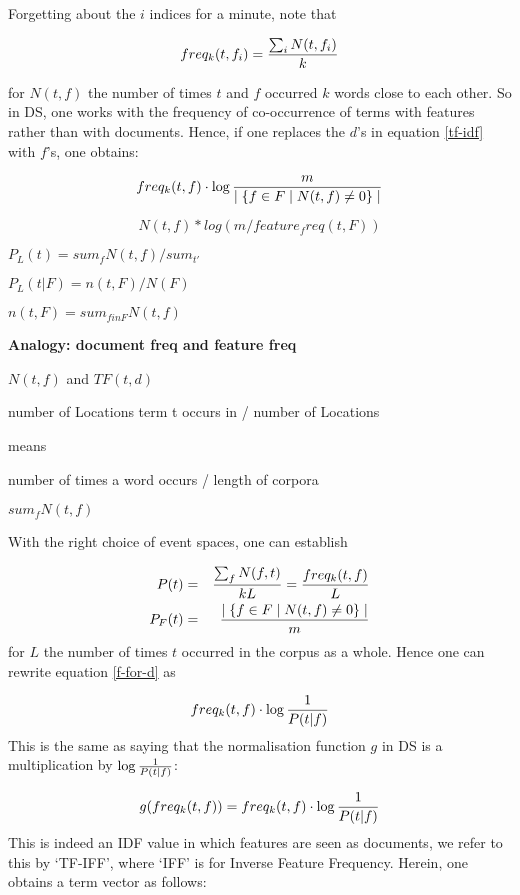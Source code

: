 Forgetting about the $i$ indices for a minute, note that 

\begin{equation}
freq_k(t,f_i) = {{\sum_i N(t,f_i)} \over {k}}
\end{equation}

for $N(t, f)$ the number of times $t$ and $f$ occurred  $k$ words close to each other.  So in DS, one works with the frequency of co-occurrence of terms with features rather than with documents. Hence, if one replaces the $d$'s in equation \ref{tf-idf} with $f$'s, one obtains:

\begin{equation}
\label{f-for-d}
freq_k(t, f) \cdot \log{{m} \over {\mid \{f \in F \mid N(t,f)  \neq 0 \}\mid}}
\end{equation}

\[
N(t, f) * log ( m / feature_freq ( t, F ) )
\]


$P_L ( t ) = sum_f N( t, f)  /  sum_{ t' }$

$P_L ( t | F ) = n (t , F) / N ( F )$

$ n ( t , F ) = sum_{f in F} N(t, f)$


{\bf Analogy: document  freq and  feature freq}

$N(t,f)$ and $TF(t,d)$




number of Locations term t occurs in / number of Locations

means

number of times a word occurs / length of corpora

$sum_f N(t,f)$

With the right choice of event spaces, one can establish

\begin{eqnarray}
P(t) &=&  {{\sum_f N(f,t)} \over {kL}} = {{freq_k(t,f)} \over {L}}\\
P_F (t) &=&  {{\mid \{f \in F \mid N(t,f)  \neq 0 \}\mid} \over {m}}
\end{eqnarray}
for $L$ the number of times $t$ occurred in the corpus as a whole.  Hence one can rewrite equation \ref{f-for-d} as

\begin{equation}
freq_k(t,f) \cdot \log{1 \over P(t|f)}
\end{equation}
This is the same as saying that  the normalisation function $g$ in DS is a multiplication by $ \log{1 \over P(t|f)}$:

\[
g(freq_k(t, f)) = freq_k(t,f) \cdot \log{1 \over P(t|f)}
\]
This  is indeed an IDF value in which features are seen as documents, we refer to this by `TF-IFF', where `IFF' is for Inverse Feature Frequency. Herein, one obtains a term vector as follows:

